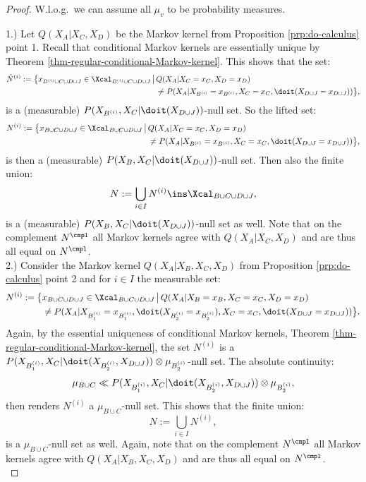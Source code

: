 \restatethmasdocalculusdetail*
\begin{proof}
 W.l.o.g.\ we can assume all $\mu_v$ to be probability measures.

 1.) Let $Q(X_A|X_C,X_D)$ be the Markov kernel from Proposition \ref{prp:do-calculus} point 1.
Recall that conditional Markov kernels are essentially unique by Theorem \ref{thm-regular-conditional-Markov-kernel}. 
    This shows that the set:
\begin{align*}
    \tilde N^{(i)} := \bigl\{ x_{B^{(i)} \cup C \cup D \cup J} \in \Xcal_{B^{(i)} \cup C \cup D \cup J} \,\big|\,
       & Q(X_A|X_C=x_C,X_D=x_D)\\ 
       &\neq P(X_A|X_{B^{(i)}}=x_{B^{(i)}},X_C=x_C,\doit(X_{D\cup J}=x_{D \cup J})) \bigr\},
\end{align*}
is a (measurable) $P(X_{B^{(i)}},X_C|\doit(X_{D\cup J}))$-null set. So the lifted set:
\begin{align*}
    N^{(i)} := \bigl\{ x_{B \cup C \cup D \cup J} \in \Xcal_{B \cup C \cup D \cup J} \,\big|\,
       & Q(X_A|X_C=x_C,X_D=x_D)\\ 
       &\neq P(X_A|X_{B^{(i)}}=x_{B^{(i)}},X_C=x_C,\doit(X_{D\cup J}=x_{D \cup J})) \bigr\},
\end{align*}
is then a (measurable) $P(X_B,X_C|\doit(X_{D\cup J}))$-null set. Then also the finite union:
 \[ N := \bigcup_{i \in I} N^{(i)}  \ins \Xcal_{B \cup C \cup D \cup J},  \]
 is a (measurable) $P(X_B,X_C|\doit(X_{D\cup J}))$-null set as well. 
 Note that on the complement $N^\cmpl$ all Markov kernels agree with $Q(X_A|X_C,X_D)$ and are thus all equal on $N^\cmpl$.\\

2.) Consider the Markov kernel $Q(X_A|X_B,X_C,X_D)$ from Proposition \ref{prp:do-calculus} point 2
    and for $i \in I$ the measurable set:
\begin{align*}
     N^{(i)} :=  \bigl\{ & x_{B \cup C \cup D \cup J} \in \Xcal_{B \cup C \cup D \cup J} \,\big|\,
        Q(X_A|X_B=x_B,X_C=x_C,X_D=x_D)\\ 
       &\neq P(X_A|X_{B_1^{(i)}}=x_{B_1^{(i)}},\doit(X_{B_2^{(i)}}=x_{B_2^{(i)}}),X_C=x_C,\doit(X_{D\cup J}=x_{D\cup J}))  \bigr\}.
\end{align*}
Again, by the essential uniqueness of conditional Markov kernels, Theorem \ref{thm-regular-conditional-Markov-kernel}, the set $N^{(i)}$ is 
a $P(X_{B_1^{(i)}},X_C|\doit(X_{B_2^{(i)}},X_{D\cup J})) \otimes \mu_{B_2^{(i)}}$-null set.
The absolute continuity:
 \[ \mu_{B \cup C} \ll  P(X_{B_1^{(i)}},X_C|\doit(X_{B_2^{(i)}},X_{D\cup J})) \otimes \mu_{B_2^{(i)}}, \]
 then renders $N^{(i)}$ a $\mu_{B \cup C}$-null set. 
 This shows that the finite union:
 \[ N := \bigcup_{i \in I} N^{(i)}, \]
 is a $\mu_{B \cup C}$-null set as well.  Again, note that on the complement $N^\cmpl$ all Markov kernels agree with $Q(X_A|X_B,X_C,X_D)$ and are thus all equal on $N^\cmpl$. \\


\end{proof}
